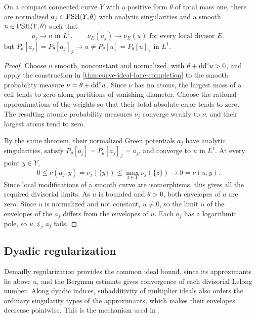 \begin{example}\label{ex:divisorial-convergence-envelope-failure}
On a compact connected curve $Y$ with a positive form $\theta$ of total mass one, there are normalized $a_j\in\mathrm{PSH}(Y,\theta)$ with analytic singularities and a smooth $u\in\mathrm{PSH}(Y,\theta)$ such that
\[
 a_j\longrightarrow u\text{ in }L^1,\qquad
 \nu_E(a_j)\longrightarrow\nu_E(u)\text{ for every local divisor }E,
\]
but $P_\theta[a_j]=P_\theta[a_j]_{\mathcal I}\to u\ne P_\theta[u]=P_\theta[u]_{\mathcal I}$ in $L^1$.
\end{example}
\begin{proof}
Choose $u$ smooth, nonconstant and normalized, with $\theta+\mathrm{dd}^{\mathrm{c}} u>0$, and apply the construction in \cref{thm:curve-ideal-lone-completion} to the smooth probability measure $\nu=\theta+\mathrm{dd}^{\mathrm{c}} u$. Since $\nu$ has no atoms, the largest mass of a cell tends to zero along partitions of vanishing diameter. Choose the rational approximations of the weights so that their total absolute error tends to zero. The resulting atomic probability measures $\nu_j$ converge weakly to $\nu$, and their largest atoms tend to zero.

By the same theorem, their normalized Green potentials $a_j$ have analytic singularities, satisfy $P_\theta[a_j]=P_\theta[a_j]_{\mathcal I}=a_j$, and converge to $u$ in $L^1$. At every point $y\in Y$,
\[
 0\leq\nu(a_j,y)=\nu_j(\{y\})
       \leq\max_{z\in Y}\nu_j(\{z\})\longrightarrow0=\nu(u,y).
\]
Since local modifications of a smooth curve are isomorphisms, this gives all the required divisorial limits. As $u$ is bounded and $\theta>0$, both envelopes of $u$ are zero. Since $u$ is normalized and not constant, $u\ne0$, so the limit $u$ of the envelopes of the $a_j$ differs from the envelopes of $u$. Each $a_j$ has a logarithmic pole, so $u\preceq_{\mathcal I}a_j$ fails.
\end{proof}

\subsection{Dyadic regularization}

Demailly regularization provides the common ideal bound, since its approximants lie above $u$, and the Bergman estimate gives convergence of each divisorial Lelong number. Along dyadic indices, subadditivity of multiplier ideals also orders the ordinary singularity types of the approximants, which makes their envelopes decrease pointwise. This is the mechanism used in \cite[Theorem~7.1.1, proof of $(3)\Rightarrow(1)$, Step~1]{SGPT}.

